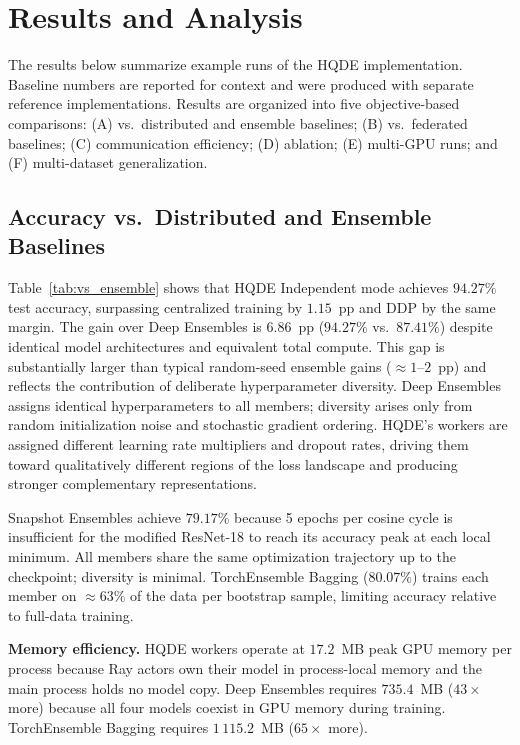 \documentclass[journal,twoside]{IEEEtran}
\newcommand{\hqde}{\mbox{HQDE}\xspace}
\begin{document}
\section{Results and Analysis}
\label{sec:results}

The results below summarize example runs of the \hqde{} implementation.
Baseline numbers are reported for context and were produced with
separate reference implementations. Results are organized into five
objective-based comparisons: (A) vs.\ distributed and ensemble
baselines; (B) vs.\ federated baselines; (C) communication efficiency;
(D) ablation; (E) multi-GPU runs; and (F) multi-dataset generalization.

\subsection{Accuracy vs.\ Distributed and Ensemble Baselines}
\label{sec:vs_ensemble}

Table~\ref{tab:vs_ensemble} shows that \hqde{} Independent mode achieves
$94.27\%$ test accuracy, surpassing centralized training by $1.15$~pp
and DDP by the same margin. The gain over Deep Ensembles is $6.86$~pp
($94.27\%$ vs.\ $87.41\%$) despite identical model architectures and
equivalent total compute. This gap is substantially larger than typical
random-seed ensemble gains ($\approx1$--$2$~pp) and reflects the
contribution of deliberate hyperparameter diversity. Deep Ensembles
assigns identical hyperparameters to all members; diversity arises only
from random initialization noise and stochastic gradient ordering.
\hqde{}'s workers are assigned different learning rate multipliers and
dropout rates, driving them toward qualitatively different regions of
the loss landscape and producing stronger complementary representations.

Snapshot Ensembles achieve $79.17\%$ because 5 epochs per cosine cycle
is insufficient for the modified ResNet-18 to reach its accuracy peak
at each local minimum. All members share the same optimization
trajectory up to the checkpoint; diversity is minimal. TorchEnsemble
Bagging ($80.07\%$) trains each member on $\approx63\%$ of the data
per bootstrap sample, limiting accuracy relative to full-data training.

\textbf{Memory efficiency.} \hqde{} workers operate at $17.2$~MB peak
GPU memory per process because Ray actors own their model in process-local
memory and the main process holds no model copy. Deep Ensembles requires
$735.4$~MB ($43\times$ more) because all four models coexist in GPU
memory during training. TorchEnsemble Bagging requires $1\,115.2$~MB
($65\times$ more).
\end{document}
